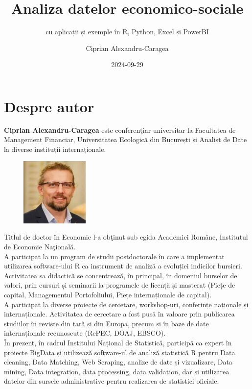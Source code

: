 \documentclass[
  11pt,
  b5paper,
  nottoc]{book}
\title{Analiza datelor economico-sociale}
\subtitle{cu aplicații și exemple în R, Python, Excel și PowerBI}
\author{Ciprian Alexandru-Caragea}
\date{2024-09-29}
\renewcommand{\contentsname}{Cuprins}
\renewcommand*\contentsname{Table of contents}
\newcommand\contentsname{Table of contents}
\begin{document}
\frontmatter
\maketitle

\renewcommand*\contentsname{Cuprins}
{
\setcounter{tocdepth}{1}
\tableofcontents
}
\listoffigures
\listoftables

\mainmatter
{}

\chapter*{Despre autor}\label{despre-autor}


\setcounter{page}{3}

\textbf{Ciprian Alexandru-Caragea} este conferenţiar universitar la
Facultatea de Management Financiar, Universitatea Ecologică din
București și Analist de Date la diverse instituții internaționale.\\

\begin{figure}
  \begin{center}
    \includegraphics[width=0.3\textwidth]{images/Ciprian_DGINS2018.jpg}
  \end{center}
\end{figure}

Titlul de doctor în Economie l-a obţinut sub egida Academiei Române,
Institutul de Economie Naţională.\\
A participat la un program de studii postdoctorale în care a implementat
utilizarea software-ului R ca instrument de analiză a evoluției
indicilor bursieri.\\
Activitatea sa didactică se concentrează, în principal, în domeniul
burselor de valori, prin cursuri și seminarii la programele de licență
și masterat (Piețe de capital, Managementul Portofoliului, Piețe
internaționale de capital).\\
A participat la diverse proiecte de cercetare, workshop-uri, conferințe
naționale și internaționale. Activitatea de cercetare a fost pusă în
valoare prin publicarea studiilor în reviste din țară și din Europa,
precum și în baze de date internaționale recunoscute (RePEC, DOAJ,
EBSCO).\\
În prezent, în cadrul Institului Național de Statistică, participă ca
expert în proiecte BigData și utilizează software-ul de analiză
statistică R pentru Data cleaning, Data Matching, Web Scraping, analize
de date și vizualizare, Data mining, Data integration, data processing,
data validation, dar și utilizarea datelor din sursele administrative
pentru realizarea de statistici oficiale.
\end{document}
